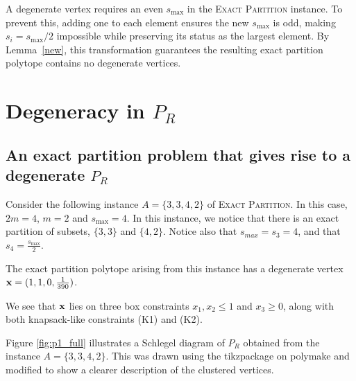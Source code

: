 \documentclass[10pt,a4paper]{amsart}
\def\ve#1{\mathchoice{\mbox{\boldmath$\displaystyle\bf#1$}}
{\mbox{\boldmath$\textstyle\bf#1$}}
{\mbox{\boldmath$\scriptstyle\bf#1$}}
{\mbox{\boldmath$\scriptscriptstyle\bf#1$}}}
\begin{document}
A degenerate vertex requires an even $s_{\max}$ in the \textsc{Exact Partition} instance. To prevent this, adding one to each element ensures the new $s_{\max}$ is odd, making $s_i = s_{\max}/2$ impossible while preserving its status as the largest element. By Lemma~\ref{new}, this transformation guarantees the resulting exact partition polytope contains no degenerate vertices.


\section{Degeneracy in $P_R$} \label{se:degen_example}

\subsection{An exact partition problem that gives rise to a degenerate $P_R$}\label{counter}
Consider the following instance $A = \{3,3,4,2\}$ of \textsc{Exact Partition}. In this case, $2m = 4$, $m=2$ and $s_{\max}=4$. In this instance, we notice that there is an exact partition of subsets, $\{3,3\}$ and $\{4,2\}$. Notice also that $s_{max}=s_3=4$, and that $s_4=\frac{s_{\max}}{2}$. 

The exact partition polytope arising from this instance has a degenerate vertex $\ve{x}=(1, 1, 0, \frac{1}{390})$.

We see that $\ve{x}$ lies on three box constraints $x_1,x_2\leq 1$ and $x_3\geq0$, along with both knapsack-like constraints (K1) and (K2).

Figure \ref{fig:p1_full} illustrates a Schlegel diagram of $P_R$ obtained from the instance $A = \{3,3,4,2\}$.  This was drawn using the tikzpackage on polymake \cite{polymake} and modified to show a clearer description of the clustered vertices. 
\end{document}
